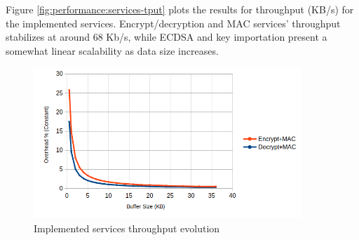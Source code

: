 Figure \ref{fig:performance:services-tput} plots the results for throughput (KB/s) for the implemented services.
Encrypt/decryption and MAC services' throughput stabilizes at around 68 Kb/s, while \ac{ECDSA} and key importation present a somewhat linear scalability as data size increases.

\begin{figure}[h!]
	\centering
	\includegraphics[width=0.9\textwidth]{./Images/buffer-overhead.png}
	\caption{Implemented services throughput evolution}
	\label{fig:performance:buffer-overhead}
\end{figure}




